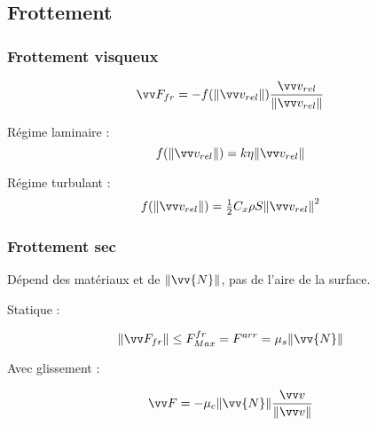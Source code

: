 \documentclass[../main.tex]{subfiles}
\begin{document}
\subsection{Frottement}


\subsubsection{Frottement visqueux}
\[
  \F_{fr} = -f(\norm{\vi_{rel}})\frac{\vi_{rel}}{\norm{\vi_{rel}}}
\]

Régime laminaire : 
\[
  f(\norm{\vi_{rel}})=k\eta\norm{\vi_{rel}}
\]

Régime turbulant :
\[
  f(\norm{\vi_{rel}}) = \tfrac{1}{2}C_x\rho S\norm{\vi_{rel}}^2
\]

\subsubsection{Frottement sec}
Dépend des matériaux et de \(\norm{\vv{N}}\), pas de l'aire de la surface. 

Statique :

\[
  \norm{\F_{fr}} \leq F_{Max}^{fr} = F^{arr}= \mu_s\norm{\vv{N}}
\]

Avec glissement :

\[
  \F=-\mu_c\norm{\vv{N}}\frac{\vi}{\norm{\vi}}
\]
\end{document}
